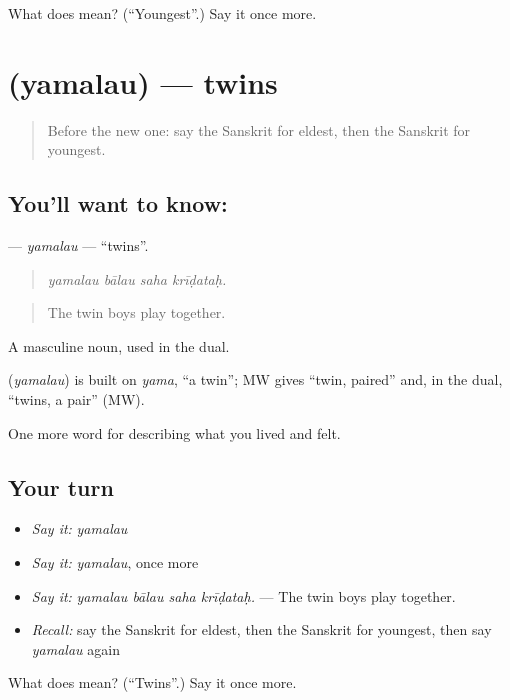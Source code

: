 \begin{tcolorbox}[breakable,colback=teal!4,colframe=teal!35!black,title={Before you move on}]
What does  mean? (\textquotedblleft{}Youngest\textquotedblright{}.) Say it once more.
\end{tcolorbox}
\section[\texorpdfstring{\sk{यमलौ} (yamalau)}{यमलौ (yamalau)}]{ (yamalau) — twins}

\label{lesson:SA-C498-yamalau}



\begin{quote}
Before the new one: say the Sanskrit for eldest, then the Sanskrit for youngest.
\end{quote}

\subsection*{You'll want to know: }
\textbf{} — \emph{yamalau} — \textquotedblleft{}twins\textquotedblright{}.

\begin{quote}
   
\end{quote}

\begin{quote}
\emph{yamalau bālau saha krīḍataḥ.}
\end{quote}

\begin{quote}
The twin boys play together.
\end{quote}

A masculine noun, used in the dual.

\begin{cousinweb}
\textbf{} (\emph{yamalau}) is built on \emph{yama}, \textquotedblleft{}a twin\textquotedblright{}; MW gives \textquotedblleft{}twin, paired\textquotedblright{} and, in the dual, \textquotedblleft{}twins, a pair\textquotedblright{} (MW).
\end{cousinweb}

\begin{grammarlens}[title={What you've built}]
One more word for describing what you lived and felt.
\end{grammarlens}

\subsection*{Your turn}
\begin{itemize}
\raggedright
  \item \emph{Say it:} \emph{yamalau}
  \item \emph{Say it:} \emph{yamalau}, once more
  \item \emph{Say it:} \emph{yamalau bālau saha krīḍataḥ.} — The twin boys play together.
  \item \emph{Recall:} say the Sanskrit for eldest, then the Sanskrit for youngest, then say \emph{yamalau} again
\end{itemize}

\begin{tcolorbox}[breakable,colback=teal!4,colframe=teal!35!black,title={Before you move on}]
What does  mean? (\textquotedblleft{}Twins\textquotedblright{}.) Say it once more.
\end{tcolorbox}
